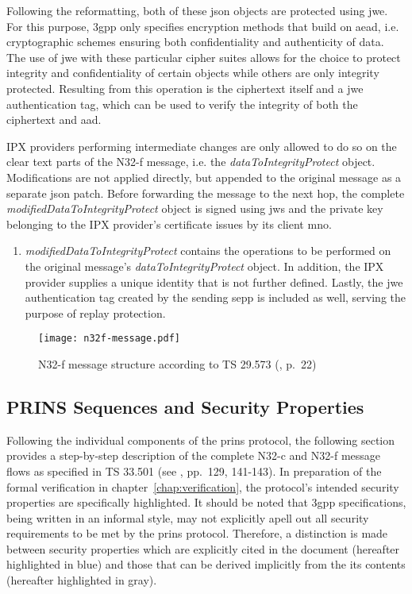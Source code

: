 Following the reformatting, both of these \gls{json} objects are protected using \gls{jwe}.
For this purpose, \gls{3gpp} only specifies encryption methods that build on \gls{aead}, i.e. cryptographic schemes ensuring both confidentiality and authenticity of data.
The use of \gls{jwe} with these particular cipher suites allows for the choice to protect integrity and confidentiality of certain objects while others are only integrity protected.
Resulting from this operation is the ciphertext itself and a \gls{jwe} authentication tag, which can be used to verify the integrity of both the ciphertext and \gls{aad}.

IPX providers performing intermediate changes are only allowed to do so on the clear text parts of the N32-f message, i.e. the \textit{dataToIntegrityProtect} object.
Modifications are not applied directly, but appended to the original message as a separate \gls{json} patch.
Before forwarding the message to the next hop, the complete \textit{modifiedDataToIntegrityProtect} object is signed using \gls{jws} and the private key belonging to the IPX provider's certificate issues by its client \gls{mno}.

\begin{enumerate}[label=--]
    \item \textit{modifiedDataToIntegrityProtect} contains the operations to be performed on the original message's \textit{dataToIntegrityProtect} object. In addition, the IPX provider supplies a unique identity that is not further defined. Lastly, the \gls{jwe} authentication tag created by the sending \gls{sepp} is included as well, serving the purpose of replay protection.
\end{enumerate}

\begin{figure}[h!]
    \centering
    \texttt{[image: n32f-message.pdf]}
    \caption{N32-f message structure according to TS 29.573 (\cite{3gpp.29.573}, p.~22)}
    \label{fig:n32f-message}
\end{figure}

\subsection{PRINS Sequences and Security Properties}
\label{ssec:prins-sequence}

Following the individual components of the \gls{prins} protocol, the following section provides a step-by-step description of the complete N32-c and N32-f message flows as specified in TS 33.501 (see \cite{3gpp.33.501}, pp.~129, 141-143).
In preparation of the formal verification in chapter~\ref{chap:verification}, the protocol's intended security properties are specifically highlighted.
It should be noted that \gls{3gpp} specifications, being written in an informal style, may not explicitly apell out all security requirements to be met by the \gls{prins} protocol.
Therefore, a distinction is made between security properties which are explicitly cited in the document (hereafter highlighted in blue) and those that can be derived implicitly from the its contents (hereafter highlighted in gray).

